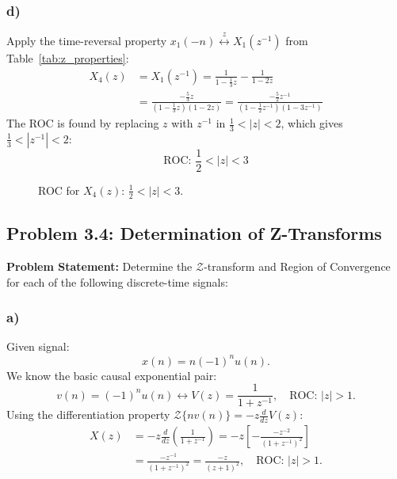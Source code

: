 \documentclass[12pt,a4paper]{article}
\begin{document}
\subsubsection*{d)}
Apply the time-reversal property $x_1(-n) \stackrel{z}{\longleftrightarrow} X_1(z^{-1})$ from Table~\ref{tab:z_properties}:
\[
\begin{aligned}
X_4(z) &= X_1(z^{-1}) = \frac{1}{1 - \frac{1}{3}z} - \frac{1}{1 - 2z} \\
&= \frac{-\frac{5}{3}z}{\left(1 - \frac{1}{3}z\right)(1 - 2z)} = \frac{-\frac{5}{2}z^{-1}}{\left(1 - \frac{1}{2}z^{-1}\right)(1 - 3z^{-1})}
\end{aligned}
\]
The ROC is found by replacing $z$ with $z^{-1}$ in $\frac{1}{3} < |z| < 2$, which gives $\frac{1}{3} < |z^{-1}| < 2$:
\[
\text{ROC: } \frac{1}{2} < |z| < 3
\]

\begin{figure}[H]
\centering
{}
\caption{ROC for $X_4(z)$: $\frac{1}{2} < |z| < 3$.}
\label{fig:p33_roc_d}
\end{figure}

\subsection{Problem 3.4: Determination of Z-Transforms}
\textbf{Problem Statement:} Determine the $\mathcal{Z}$-transform and Region of Convergence for each of the following discrete-time signals:

\subsubsection*{a)}
Given signal:
\begin{equation}
    x(n) = n(-1)^n u(n).
\end{equation}
We know the basic causal exponential pair:
\begin{equation}
    v(n) = (-1)^n u(n) \longleftrightarrow V(z) = \frac{1}{1 + z^{-1}}, \quad \text{ROC: } |z| > 1.
\end{equation}
Using the differentiation property $\mathcal{Z}\{n v(n)\} = -z \frac{d}{dz} V(z)$:
\begin{align}
    X(z) &= -z \frac{d}{dz}\left( \frac{1}{1 + z^{-1}} \right) = -z \left[ -\frac{-z^{-2}}{(1 + z^{-1})^2} \right] \nonumber \\
         &= \frac{-z^{-1}}{(1 + z^{-1})^2} = \frac{-z}{(z + 1)^2}, \quad \text{ROC: } |z| > 1.
\end{align}
\end{document}
